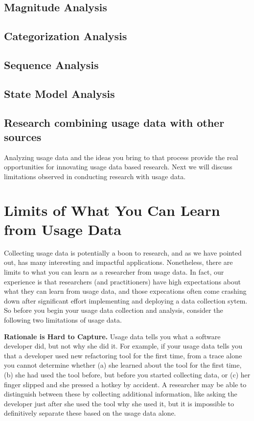 \subsection{Magnitude Analysis}


\subsection{Categorization Analysis}


\subsection{Sequence Analysis}


\subsection{State Model Analysis}


\subsection{Research combining usage data with other sources}



Analyzing usage data and the ideas you bring to that process provide the real opportunities for innovating usage data based research.  Next we will discuss limitations observed in conducting research with usage data.

\section{Limits of What You Can Learn from Usage Data}\label{sec:limitations}

Collecting usage data is potentially a boon to research, and as we have
pointed out, has many interesting and impactful applications.
Nonetheless, there are limits to what you can learn as a researcher
from usage data.
In fact, our experience is that researchers (and practitioners) have 
high expectations about what they can learn from usage data, and those
expecations often come crashing down after significant effort implementing
and deploying a data collection sytem.
So before you begin your usage data collection and analysis, consider
the following two limitations of usage data.

\textbf{Rationale is Hard to Capture.}
Usage data tells you what a software developer did, but not
why she did it.
For example, if your usage data tells you that a developer used 
new refactoring tool for the first time, from a trace alone you cannot determine whether
(a) she learned about the tool for the first time, (b) she had used the tool before,
but before you started collecting data, or (c) her finger slipped and 
she pressed a hotkey by accident.
A researcher may be able to distinguish between these by collecting additional information,
like asking the developer just after she used the tool why she used it,
but it is impossible to definitively separate these based on the 
usage data alone.

